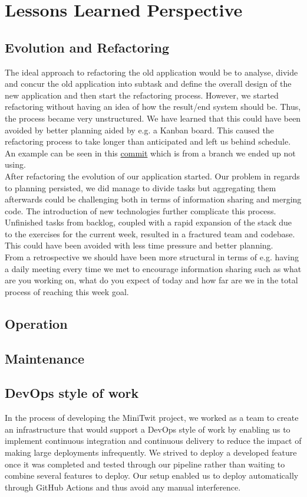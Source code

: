 \section{Lessons Learned Perspective}

\subsection{Evolution and Refactoring}
The ideal approach to refactoring the old application would be to analyse, divide and concur the old application into 
subtask and define the overall design of the new application and then start the refactoring process. However, we started
refactoring without having an idea of how the result/end system should be. Thus, the process became very unstructured. 
We have learned that this could have been avoided by better planning aided by e.g. a Kanban board. This caused the 
refactoring process to take longer than anticipated and left us behind schedule. An example can be seen in this
\href{https://github.com/organizationGB/DevOps/commit/7bbccc97d6d69e90724b00e93e92334210490085}{commit} which is from a 
branch we ended up not using. \\

After refactoring the evolution of our application started. Our problem in regards to planning persisted, we did manage
to divide tasks but aggregating them afterwards could be challenging both in terms of information sharing and merging 
code. The introduction of new technologies further complicate this process. Unfinished tasks from backlog, coupled
with a rapid expansion of the stack due to the exercises for the current week, resulted in a fractured team and
codebase. This could have been avoided with less time pressure and better planning.\\

From a retrospective we should have been more structural in terms of e.g. having a daily meeting every time we met to encourage 
information sharing such as what are you working on, what do you expect of today and how far are we in the total process
of reaching this week goal.

\subsection{Operation}

\subsection{Maintenance}

\subsection{DevOps style of work}
In the process of developing the MiniTwit project, we worked as a team to create an infrastructure that would support a DevOps style of work by enabling us 
to implement continuous integration and continuous delivery to reduce the impact of making large deployments infrequently. We strived to deploy a developed 
feature once it was completed and tested through our pipeline rather than waiting to combine several features to deploy. Our setup enabled us to deploy automatically
through GitHub Actions and thus avoid any manual interference.